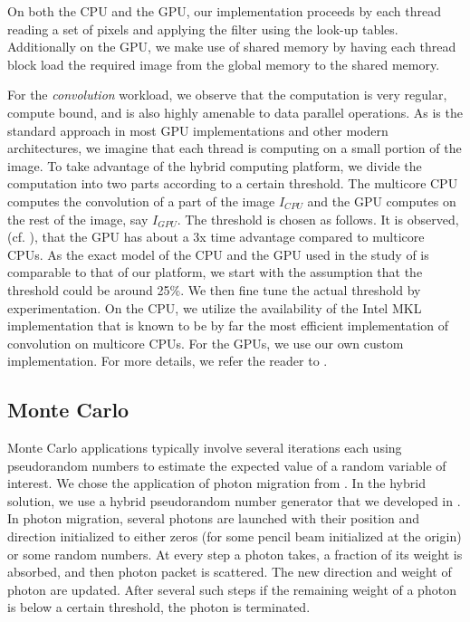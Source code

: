 \documentclass[11pt]{article}
\begin{document}
On both the CPU and the GPU, our implementation proceeds by each
thread reading a set of pixels and applying the filter using the look-up
tables. Additionally on the GPU, we make use of shared memory by having each
thread block load the required image from the global memory to the shared
memory. 



For the {\em convolution} workload, we observe that the computation is very
regular, compute bound,  and is also highly amenable to data parallel 
operations. As is the standard approach in most GPU implementations and
other modern architectures, we imagine that each thread is computing on a
small portion of the image. To take advantage of the hybrid computing
platform, we divide the computation into two parts according to a certain
threshold. The multicore CPU computes the convolution of a part of the image
$I_{CPU}$ and the GPU computes on the rest of the image, say $I_{GPU}$. The
threshold is chosen as follows. It is observed, (cf. \cite{isca10}), that
the GPU has about a 3x time advantage compared to multicore CPUs. As the
exact model of the CPU and the GPU used in the study of \cite{isca10} is
comparable to that of our platform, we start with the assumption that the
threshold could be around 25\%. We then fine tune the actual threshold by
experimentation. On the CPU, we utilize the availability of the Intel MKL
implementation that is known to be by far the most efficient implementation
of convolution on multicore CPUs. For the GPUs, we use our own custom
implementation. For more details, we refer the reader to \cite{srs12}.

\subsection{Monte Carlo}
Monte Carlo applications typically involve several iterations each using
pseudorandom numbers to estimate the expected value of a random variable of
interest.  We chose the application of photon
migration from \cite{bcsd02}. In the hybrid solution, we
use a hybrid pseudorandom number generator that we developed in
\cite{lspp12}. 
In photon migration, several photons are launched with their
position and direction initialized to either zeros (for some
pencil beam initialized at the origin) or some random numbers.
At every step a photon takes, a fraction of its
weight is absorbed, and then photon packet is scattered. The
new direction and weight of photon are updated. After several
such steps if the remaining weight of a photon is below a
certain threshold, the photon is terminated.
\end{document}
